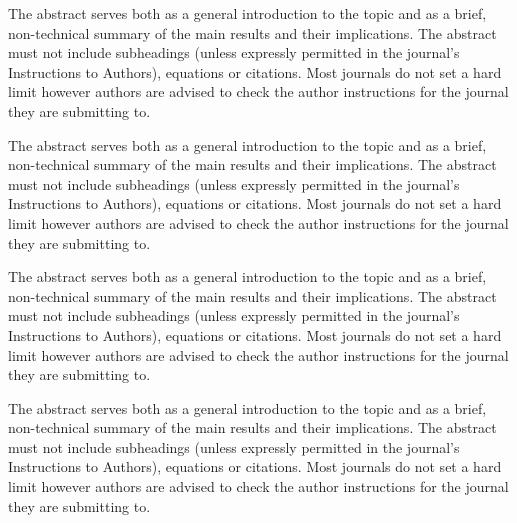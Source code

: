 \begin{abstract*}
  The abstract serves both as a general introduction to the topic and as a brief, non-technical summary of the main results and their implications. The abstract must not include subheadings (unless expressly permitted in the journal's Instructions to Authors), equations or citations.  Most journals do not set a hard limit however authors are advised to check the author instructions for the journal they are submitting to.

  The abstract serves both as a general introduction to the topic and as a brief, non-technical summary of the main results and their implications. The abstract must not include subheadings (unless expressly permitted in the journal's Instructions to Authors), equations or citations. Most journals do not set a hard limit however authors are advised to check the author instructions for the journal they are submitting to.

  The abstract serves both as a general introduction to the topic and as a brief, non-technical summary of the main results and their implications. The abstract must not include subheadings (unless expressly permitted in the journal's Instructions to Authors), equations or citations.  Most journals do not set a hard limit however authors are advised to check the author instructions for the journal they are submitting to.


 The abstract serves both as a general introduction to the topic and as a brief, non-technical summary of the main results and their implications. The abstract must not include subheadings (unless expressly permitted in the journal's Instructions to Authors), equations or citations.  Most journals do not set a hard limit however authors are advised to check the author instructions for the journal they are submitting to.

\end{abstract*}
